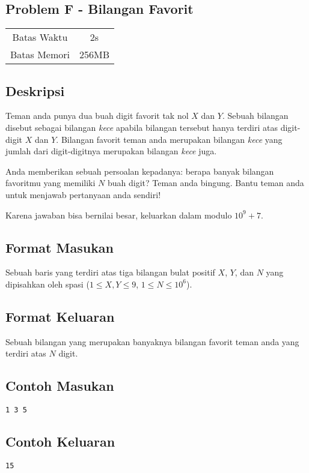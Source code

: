 \documentclass{article}
\begin{document}
\begin{center}
    \section*{Problem F - Bilangan Favorit} %

    \begin{tabular}{ | c c | }
        \hline
        Batas Waktu  & 2s \\    %
        Batas Memori & 256MB \\  %
        \hline
    \end{tabular}
\end{center}

\subsection*{Deskripsi}

Teman anda punya dua buah digit favorit tak nol $X$ dan $Y$. Sebuah bilangan disebut sebagai bilangan \textit{kece} apabila bilangan tersebut hanya terdiri atas digit-digit $X$ dan $Y$. Bilangan favorit teman anda merupakan bilangan \textit{kece} yang jumlah dari digit-digitnya merupakan bilangan \textit{kece} juga. 

Anda memberikan sebuah persoalan kepadanya: berapa banyak bilangan favoritmu yang memiliki $N$ buah digit? Teman anda bingung. Bantu teman anda untuk menjawab pertanyaan anda sendiri!

Karena jawaban bisa bernilai besar, keluarkan dalam modulo $10^9 + 7$.

\subsection*{Format Masukan}

Sebuah baris yang terdiri atas tiga bilangan bulat positif $X$, $Y$, dan $N$ yang dipisahkan oleh spasi ($1 \leq X, Y \leq 9$, $1 \leq N \leq 10^6$).

\subsection*{Format Keluaran}

Sebuah bilangan yang merupakan banyaknya bilangan favorit teman anda yang terdiri atas $N$ digit.
\\

\begin{multicols}{2}
\subsection*{Contoh Masukan}
\begin{lstlisting}
1 3 5
\end{lstlisting}
\columnbreak
\subsection*{Contoh Keluaran}
\begin{lstlisting}
15
\end{lstlisting}
\vfill
\null
\end{multicols}
\end{document}
